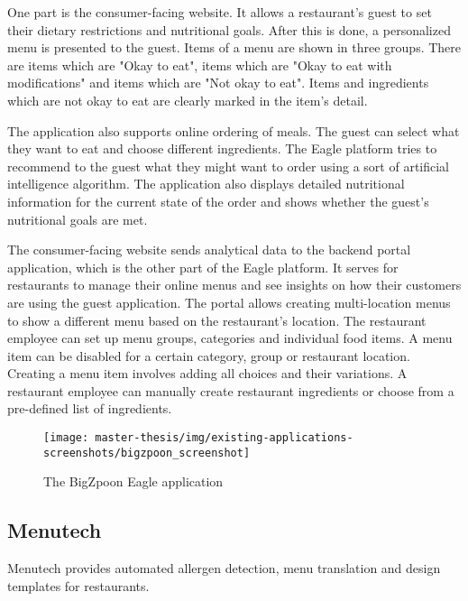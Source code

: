   One part is the consumer-facing website.
  It allows a restaurant's guest to set their dietary restrictions and nutritional goals.
  After this is done, a personalized menu is presented to the guest.
  Items of a menu are shown in three groups.
  There are items which are "Okay to eat", items which are "Okay to eat with modifications" and items which are "Not okay to eat".
  Items and ingredients which are not okay to eat are clearly marked in the item's detail.
  
  The application also supports online ordering of meals.
  The guest can select what they want to eat and choose different ingredients.
  The Eagle platform tries to recommend to the guest what they might want to order using a sort of artificial intelligence algorithm.
  The application also displays detailed nutritional information for the current state of the order and shows whether the guest's nutritional goals are met.

  The consumer-facing website sends analytical data to the backend portal application, which is the other part of the Eagle platform.
  It serves for restaurants to manage their online menus and see insights on how their customers are using the guest application.
  The portal allows creating multi-location menus to show a different menu based on the restaurant's location.
  The restaurant employee can set up menu groups, categories and individual food items.
  A menu item can be disabled for a certain category, group or restaurant location.
  Creating a menu item involves adding all choices and their variations.
  A restaurant employee can manually create restaurant ingredients or choose from a pre-defined list of ingredients.

  \begin{figure}[h]
    \centering
    \texttt{[image: master-thesis/img/existing-applications-screenshots/bigzpoon\_screenshot]}
    \caption{The BigZpoon Eagle application}
  \end{figure}

\newpage

\subsection*{Menutech}
  Menutech provides automated allergen detection, menu translation and design templates for restaurants.
  
